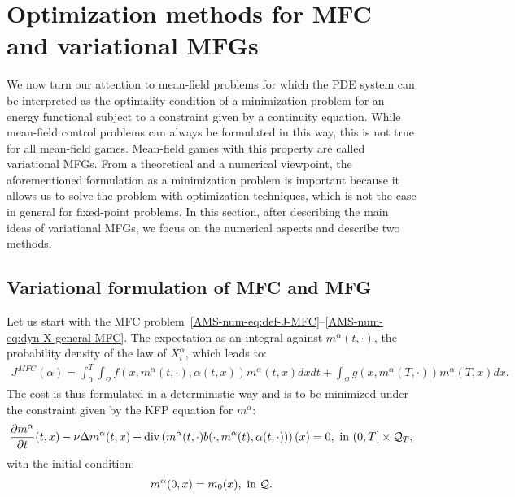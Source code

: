 \documentclass{amsproc}
\theoremstyle{definition}
\theoremstyle{remark}
\numberwithin{equation}{section}
\newcommand{\ctrl}{\alpha}
\newcommand{\dom}{\mathcal{Q}}
\newcommand{\domT}{\mathcal{Q}_{T}}
\newcommand{\diver}{\mathrm{div}}
\begin{document}
\clearpage












\clearpage


\section{\bf Optimization methods for MFC and variational MFGs}
\label{AMS-num-sec:optim-variational}

We now turn our attention to mean-field problems for which the PDE system can be interpreted as the optimality condition of a minimization problem for an energy functional subject to a constraint given by a continuity equation. While mean-field control problems can always be formulated in this way, this is not true for all mean-field games. Mean-field games with this property are called variational MFGs.  From a theoretical and a numerical viewpoint, the aforementioned formulation as a minimization problem is important because it allows us to solve the problem with optimization techniques, which is not the case in general for fixed-point problems. In this section, after describing the main ideas of variational MFGs, we focus on the numerical aspects and describe two methods.  







\subsection{Variational formulation of MFC and MFG}

Let us start with the MFC problem~\eqref{AMS-num-eq:def-J-MFC}--\eqref{AMS-num-eq:dyn-X-general-MFC}. The expectation as an integral against $m^{\ctrl}(t, \cdot)$, the probability density of the law of $X_t^{\ctrl}$, which leads to:
\begin{align*}
	J^{MFC}(\ctrl) = \int_0^T \int_{\dom} f(x, m^{\ctrl}(t,\cdot), \ctrl(t,x) ) m^{\ctrl}(t,x) dx dt + \int_{\dom} g(x, m^{\ctrl}(T,\cdot)) m^{\ctrl}(T,x) dx. 
\end{align*}
The cost is thus formulated in a deterministic way and is to be minimized under the constraint given by the KFP equation for $m^{\ctrl}$:
\begin{equation}
\label{AMS-num-eq:KFP-ctrl-Q}
	\frac{\partial m^{\ctrl}}{\partial t}(t,x)  - \nu \Delta m^{\ctrl}(t,x) + \diver\left( m^{\ctrl}(t,\cdot) b(\cdot, m^{\ctrl}(t), \ctrl(t,\cdot)) \right)(x) = 0, 
	\hbox{ in } (0,T] \times \domT ,
\end{equation}
with the initial condition:
\begin{equation}
\label{AMS-num-eq:KFP-ctrl-Q-init}
	m^{\ctrl}(0,x) = m_0(x), 
	\hbox{ in } \dom.
\end{equation}
\end{document}
